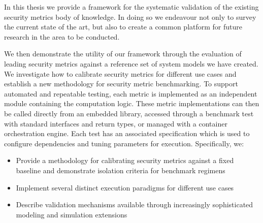 



In this thesis we provide a framework for the systematic validation of the existing security metrics body of knowledge. In doing so we endeavour not only to survey the current state of the art, but also to create a common platform for future research in the area to be conducted. 

We  then  demonstrate  the  utility  of  our  framework  through  the  evaluation  of  leading security metrics against a reference set of system models we have created.  We investigate how  to  calibrate  security  metrics  for  different  use  cases  and  establish  a new methodology  for security metric benchmarking. To support automated and repeatable testing, each metric is implemented as an independent module containing the computation logic. These metric implementations can then be called directly from an embedded library, accessed through a benchmark test with standard interfaces and return types, or managed with a container orchestration engine. Each test has an associated specification which is used to configure dependencies and tuning parameters for execution. 
Specifically, we:
\begin{itemize}
\item Provide a methodology for calibrating security metrics against a fixed baseline and demonstrate isolation criteria for benchmark regimens
\item  Implement several distinct execution paradigms for different use cases 
\item Describe validation mechanisms available through increasingly sophisticated modeling and simulation extensions
\end{itemize}

